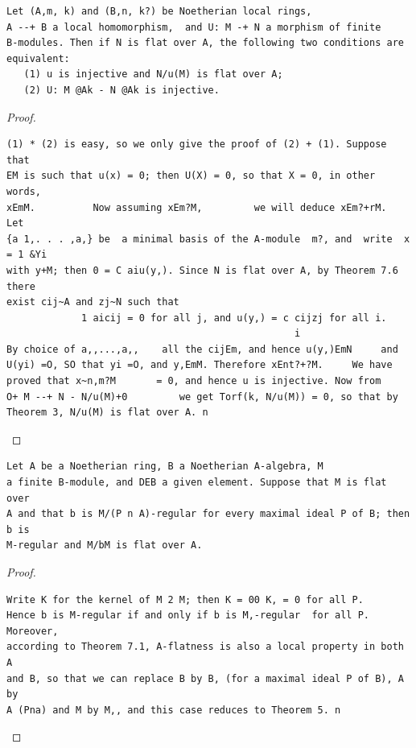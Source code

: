 \begin{theorem}\label{mcrt-auto-theorem-22-5}\uses{}
\begin{verbatim}
Let (A,m, k) and (B,n, k?) be Noetherian local rings,
A --+ B a local homomorphism,  and U: M -+ N a morphism of finite
B-modules. Then if N is flat over A, the following two conditions are
equivalent:
   (1) u is injective and N/u(M) is flat over A;
   (2) U: M @Ak - N @Ak is injective.
\end{verbatim}
\end{theorem}
\begin{proof}
\begin{verbatim}
(1) * (2) is easy, so we only give the proof of (2) + (1). Suppose that
EM is such that u(x) = 0; then U(X) = 0, so that X = 0, in other words,
xEmM.          Now assuming xEm?M,         we will deduce xEm?+rM.         Let
{a 1,. . . ,a,} be  a minimal basis of the A-module  m?, and  write  x = 1 &Yi
with y+M; then 0 = C aiu(y,). Since N is flat over A, by Theorem 7.6 there
exist cij~A and zj~N such that
             1 aicij = 0 for all j, and u(y,) = c cijzj for all i.
                                                  i
By choice of a,,...,a,,    all the cijEm, and hence u(y,)EmN     and
U(yi) =O, SO that yi =O, and y,EmM. Therefore xEnt?+?M.     We have
proved that x~n,m?M       = 0, and hence u is injective. Now from
O+ M --+ N - N/u(M)+0         we get Torf(k, N/u(M)) = 0, so that by
Theorem 3, N/u(M) is flat over A. n
\end{verbatim}
\end{proof}


\begin{theorem}\label{mcrt-auto-theorem-22-6}\uses{}
\begin{verbatim}
Let A be a Noetherian ring, B a Noetherian A-algebra, M
a finite B-module, and DEB a given element. Suppose that M is flat over
A and that b is M/(P n A)-regular for every maximal ideal P of B; then b is
M-regular and M/bM is flat over A.
\end{verbatim}
\end{theorem}
\begin{proof}
\begin{verbatim}
Write K for the kernel of M 2 M; then K = 00 K, = 0 for all P.
Hence b is M-regular if and only if b is M,-regular  for all P. Moreover,
according to Theorem 7.1, A-flatness is also a local property in both A
and B, so that we can replace B by B, (for a maximal ideal P of B), A by
A (Pna) and M by M,, and this case reduces to Theorem 5. n
\end{verbatim}
\end{proof}


